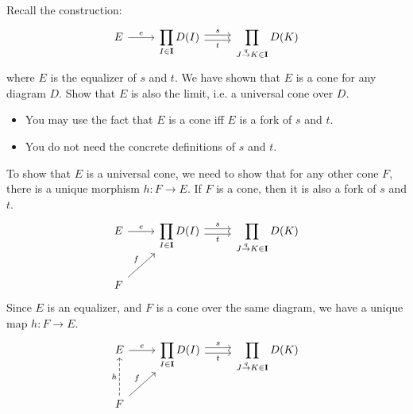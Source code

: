 \begin{exercise}
  Recall the construction:
  \[
    \begin{tikzcd}
      E \arrow{r}{e} &
      \displaystyle \prod_{I \in \bf{I}} D(I) \arrow[r,shift left, "s"] \arrow[r,shift right,swap,"t"] &
      \displaystyle \prod_{J \overset{q}{\to} K \in \bf{I}} D(K)
    \end{tikzcd}
  \]
  where $E$ is the equalizer of $s$ and $t$.
  We have shown that $E$ is a cone for any diagram $D$. Show that $E$ is also the limit,
  i.e. a universal cone over $D$.
\end{exercise}
\begin{hint}
  \begin{itemize}
  \item You may use the fact that $E$ is a cone iff $E$ is a fork of $s$ and $t$.
  \item You do not need the concrete definitions of $s$ and $t$.
  \end{itemize}
\end{hint}
\begin{answer}
  To show that $E$ is a universal cone, we need to show that for any other cone $F$, there is a unique 
  morphism $h : F \to E$.
  If $F$ is a cone, then it is also a fork of $s$ and $t$.
  \[
    \begin{tikzcd}
      E \arrow{r}{e} &
      \displaystyle \prod_{I \in \bf{I}} D(I) \arrow[r,shift left, "s"] \arrow[r,shift right,swap,"t"] &
      \displaystyle \prod_{J \overset{q}{\to} K \in \bf{I}} D(K) \\
      F \arrow{ur}{f} & &
    \end{tikzcd}
  \]
  Since $E$ is an equalizer, and $F$ is a cone over the same diagram, we have a unique map $h : F \to E$.
  \[
    \begin{tikzcd}
      E \arrow{r}{e} &
      \displaystyle \prod_{I \in \bf{I}} D(I) \arrow[r,shift left, "s"] \arrow[r,shift right,swap,"t"] &
      \displaystyle \prod_{J \overset{q}{\to} K \in \bf{I}} D(K) \\
      F \arrow{ur}{f} \arrow[dashed]{u}{h} & &
    \end{tikzcd}
  \]


\end{answer}



